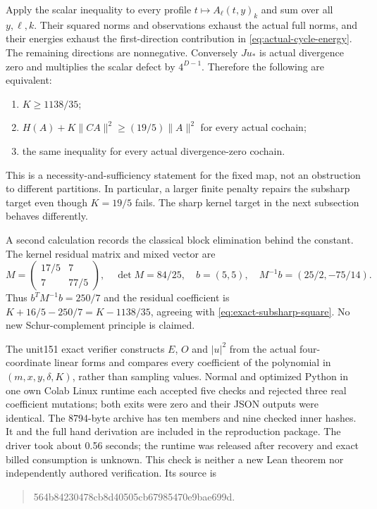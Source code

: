 Apply the scalar inequality to every profile
$t\mapsto A_\ell(t,y)_k$ and sum over all $y,\ell,k$.
Their squared norms and observations exhaust the actual full norms,
and their energies exhaust the first-direction contribution in
\eqref{eq:actual-cycle-energy}. The remaining directions are
nonnegative. Conversely $Ju_*$ is actual divergence zero and multiplies
the scalar defect by $4^{D-1}$. Therefore the following are equivalent:
\begin{enumerate}
 \item $K\geq1138/35$;
 \item $H(A)+K\|CA\|^2\geq(19/5)\|A\|^2$ for every actual cochain;
 \item the same inequality for every actual divergence-zero cochain.
\end{enumerate}
This is a necessity-and-sufficiency statement for the fixed map, not
an obstruction to different partitions. In particular, a larger finite
penalty repairs the subsharp target even though $K=19/5$ fails.
The sharp kernel target in the next subsection behaves differently.

A second calculation records the classical block elimination behind the
constant. The kernel residual matrix and mixed vector are
\[
 M=\begin{pmatrix}17/5&7\\7&77/5\end{pmatrix},\quad
 \det M=84/25,\quad b=(5,5),\quad
 M^{-1}b=(25/2,-75/14).
\]
Thus $b^TM^{-1}b=250/7$ and the residual coefficient is
$K+16/5-250/7=K-1138/35$, agreeing with
\eqref{eq:exact-subsharp-square}. No new Schur-complement principle is claimed.

The unit151 exact verifier constructs $E$, $O$ and $|u|^2$ from the actual
four-coordinate linear forms and compares every coefficient of the
polynomial in $(m,x,y,\delta,K)$, rather than sampling values. Normal and
optimized Python in one own Colab Linux runtime each accepted five checks
and rejected three real coefficient mutations; both exits were zero and
their JSON outputs were identical. The 8794-byte archive has ten members
and nine checked inner hashes. It and the full hand derivation are
included in the reproduction package. The driver took about 0.56 seconds;
the runtime was released after recovery and exact billed consumption is
unknown. This check is neither a new Lean theorem nor independently
authored verification. Its source is
\begin{quote}\small\ttfamily
564b84230478cb8d40505cb67985470e9bae699d.
\end{quote}
